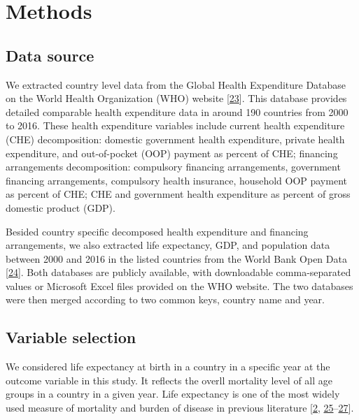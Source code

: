 \documentclass[]{elsarticle} %
\begin{document}
\hypertarget{methods}{%
\section{Methods}\label{methods}}

\hypertarget{data-source}{%
\subsection{Data source}\label{data-source}}

We extracted country level data from the Global Health Expenditure Database on the World Health Organization (WHO) website {[}\protect\hyperlink{ref-WHOdata}{23}{]}.
This database provides detailed comparable health expenditure data in around 190 countries from 2000 to 2016.
These health expenditure variables include current health expenditure (CHE) decomposition: domestic government health expenditure, private health expenditure, and out-of-pocket (OOP) payment as percent of CHE;
financing arrangements decomposition: compulsory financing arrangements, government financing arrangements, compulsory health insurance, household OOP payment as percent of CHE; CHE and government health expenditure as percent of gross domestic product (GDP).

Besided country specific decomposed health expenditure and financing arrangements, we also extracted life expectancy, GDP, and population data between 2000 and 2016 in the listed countries from the World Bank Open Data {[}\protect\hyperlink{ref-worldbank}{24}{]}.
Both databases are publicly available, with downloadable comma-separated values or Microsoft Excel files provided on the WHO website.
The two databases were then merged according to two common keys, country name and year.

\hypertarget{variable-selection}{%
\subsection{Variable selection}\label{variable-selection}}

We considered life expectancy at birth in a country in a specific year at the outcome variable in this study.
It reflects the overll mortality level of all age groups in a country in a given year.
Life expectancy is one of the most widely used measure of mortality and burden of disease in previous literature {[}\protect\hyperlink{ref-mathers2015causes}{2}, \protect\hyperlink{ref-lee2012effect}{25}--\protect\hyperlink{ref-bennett2015future}{27}{]}.
\end{document}
